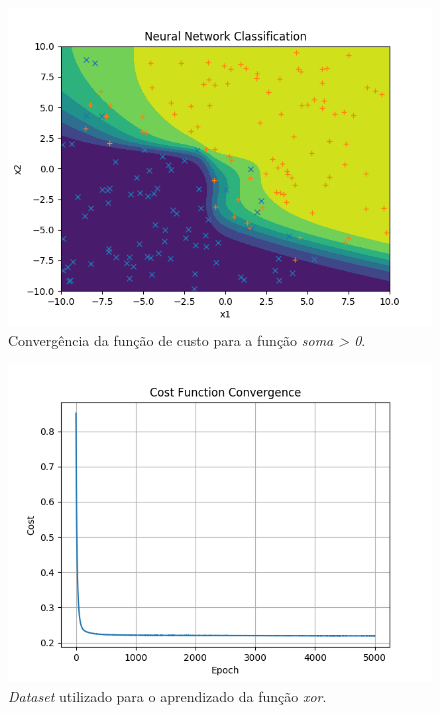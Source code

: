 \documentclass[conference]{IEEEtran}
\begin{document}
\begin{figure}[htbp]
\centering
\centerline{\includegraphics[scale=0.5]{imagens/sum_gt_zero/lambda_zero/nn_classification_sgz.png}}
\caption{Convergência da função de custo para a função \textit{soma > 0}.}
\label{sum_gt_zero/lambda_zero/nn_classification_sgz}
\end{figure}

\begin{figure}[htbp]
\centering
\centerline{\includegraphics[scale=0.5]{imagens/sum_gt_zero/convergence_sgz.png}}
\caption{\textit{Dataset} utilizado para o aprendizado da função \textit{xor}.}
\label{sum_gt_zero/convergence_sgz}
\end{figure}
\end{document}
